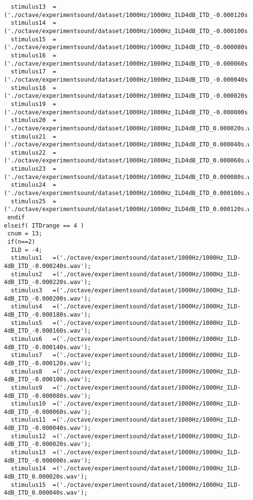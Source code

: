 {\begin{verbatim}
  stimulus13  =('./octave/experimentsound/dataset/1000Hz/1000Hz_ILD4dB_ITD_-0.000120s.wav');
  stimulus14  =('./octave/experimentsound/dataset/1000Hz/1000Hz_ILD4dB_ITD_-0.000100s.wav');
  stimulus15  =('./octave/experimentsound/dataset/1000Hz/1000Hz_ILD4dB_ITD_-0.000080s.wav');
  stimulus16  =('./octave/experimentsound/dataset/1000Hz/1000Hz_ILD4dB_ITD_-0.000060s.wav');
  stimulus17  =('./octave/experimentsound/dataset/1000Hz/1000Hz_ILD4dB_ITD_-0.000040s.wav');
  stimulus18  =('./octave/experimentsound/dataset/1000Hz/1000Hz_ILD4dB_ITD_-0.000020s.wav');
  stimulus19  =('./octave/experimentsound/dataset/1000Hz/1000Hz_ILD4dB_ITD_-0.000000s.wav');
  stimulus20  =('./octave/experimentsound/dataset/1000Hz/1000Hz_ILD4dB_ITD_0.000020s.wav');
  stimulus21  =('./octave/experimentsound/dataset/1000Hz/1000Hz_ILD4dB_ITD_0.000040s.wav');
  stimulus22  =('./octave/experimentsound/dataset/1000Hz/1000Hz_ILD4dB_ITD_0.000060s.wav');
  stimulus23  =('./octave/experimentsound/dataset/1000Hz/1000Hz_ILD4dB_ITD_0.000080s.wav');
  stimulus24  =('./octave/experimentsound/dataset/1000Hz/1000Hz_ILD4dB_ITD_0.000100s.wav');
  stimulus25  =('./octave/experimentsound/dataset/1000Hz/1000Hz_ILD4dB_ITD_0.000120s.wav');
 endif
elseif( ITDrange == 4 )
 cnum = 13;
 if(n==2)
  ILD = -4;
  stimulus1   =('./octave/experimentsound/dataset/1000Hz/1000Hz_ILD-4dB_ITD_-0.000240s.wav');
  stimulus2   =('./octave/experimentsound/dataset/1000Hz/1000Hz_ILD-4dB_ITD_-0.000220s.wav');
  stimulus3   =('./octave/experimentsound/dataset/1000Hz/1000Hz_ILD-4dB_ITD_-0.000200s.wav');
  stimulus4   =('./octave/experimentsound/dataset/1000Hz/1000Hz_ILD-4dB_ITD_-0.000180s.wav');
  stimulus5   =('./octave/experimentsound/dataset/1000Hz/1000Hz_ILD-4dB_ITD_-0.000160s.wav');
  stimulus6   =('./octave/experimentsound/dataset/1000Hz/1000Hz_ILD-4dB_ITD_-0.000140s.wav');
  stimulus7   =('./octave/experimentsound/dataset/1000Hz/1000Hz_ILD-4dB_ITD_-0.000120s.wav');
  stimulus8   =('./octave/experimentsound/dataset/1000Hz/1000Hz_ILD-4dB_ITD_-0.000100s.wav');
  stimulus9   =('./octave/experimentsound/dataset/1000Hz/1000Hz_ILD-4dB_ITD_-0.000080s.wav');
  stimulus10  =('./octave/experimentsound/dataset/1000Hz/1000Hz_ILD-4dB_ITD_-0.000060s.wav');
  stimulus11  =('./octave/experimentsound/dataset/1000Hz/1000Hz_ILD-4dB_ITD_-0.000040s.wav');
  stimulus12  =('./octave/experimentsound/dataset/1000Hz/1000Hz_ILD-4dB_ITD_-0.000020s.wav');
  stimulus13  =('./octave/experimentsound/dataset/1000Hz/1000Hz_ILD-4dB_ITD_-0.000000s.wav');
  stimulus14  =('./octave/experimentsound/dataset/1000Hz/1000Hz_ILD-4dB_ITD_0.000020s.wav');
  stimulus15  =('./octave/experimentsound/dataset/1000Hz/1000Hz_ILD-4dB_ITD_0.000040s.wav');

\end{verbatim}}
